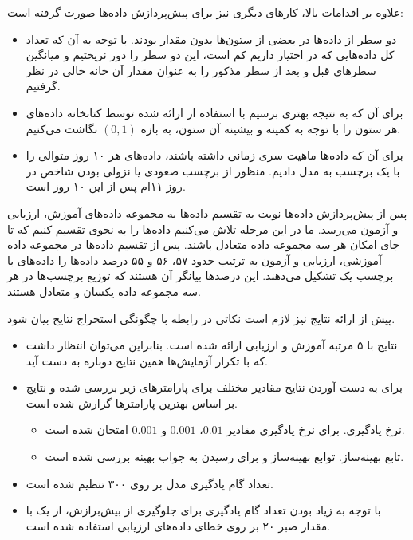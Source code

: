 \documentclass[12pt, a4paper]{book}
\begin{document}
علاوه بر اقدامات بالا، کار‌های دیگری نیز برای پیش‌پردازش داده‌ها صورت گرفته است:

\begin{itemize}
    \item دو سطر از داده‌ها در بعضی از ستون‌ها بدون مقدار بودند. با توجه به آن که تعداد کل داده‌هایی که در اختیار داریم
    کم است، این دو سطر را دور نریختیم و میانگین سطر‌های قبل و بعد از سطر مذکور را به عنوان مقدار آن خانه خالی در
    نظر گرفتیم.
    \item برای آن که به نتیجه بهتری برسیم با استفاده از  ارائه شده توسط کتابخانه 
    داده‌های هر ستون را با توجه به کمینه و بیشینه آن ستون، به بازه $(0,1)$ نگاشت می‌کنیم.
    \item برای آن که داده‌ها ماهیت سری زمانی داشته باشند، داده‌های هر ۱۰ روز متوالی را با یک برچسب به مدل دادیم.
    منظور از برچسب صعودی یا نزولی بودن شاخص در روز ۱۱ام پس از این ۱۰ روز است.
\end{itemize}

پس از پیش‌پردازش داده‌ها نوبت به تقسیم داده‌ها به مجموعه داده‌های آموزش، ارزیابی و آزمون می‌رسد. ما در این مرحله
تلاش می‌کنیم داده‌ها را به نحوی تقسیم کنیم که تا جای امکان هر سه مجموعه داده متعادل باشند. پس از تقسیم داده‌ها
در مجموعه داده آموزشی، ارزیابی و آزمون به ترتیب حدود ۵۷، ۵۶ و ۵۵ درصد داده‌ها را داده‌های با برچسب یک تشکیل می‌دهند.
این درصد‌ها بیانگر آن هستند که توزیع برچسب‌ها در هر سه مجموعه داده یکسان و متعادل هستند.

پیش از ارائه نتایج نیز لازم است نکاتی در رابطه با چگونگی استخراج نتایج بیان شود.

\begin{itemize}
    \item نتایج با ۵ مرتبه آموزش و ارزیابی ارائه شده است. بنابراین می‌توان انتظار داشت که با تکرار آزمایش‌ها
    همین نتایج دوباره به دست آید.
    \item برای به دست آوردن نتایج مقادیر مختلف برای پارامتر‌های زیر بررسی شده و نتایج بر اساس بهترین پارامتر‌ها
    گزارش شده است.
    \begin{itemize}
        \item نرخ یادگیری. برای نرخ یادگیری مقادیر $0.01$، $0.001$ و $0.001$ امتحان شده است.
        \item تابع بهینه‌ساز. توابع بهینه‌ساز  و  برای رسیدن به جواب بهینه بررسی شده است.
    \end{itemize}
    \item تعداد گام یادگیری مدل بر روی ۳۰۰ تنظیم شده است.
    \item با توجه به زیاد بودن تعداد گام یادگیری برای جلوگیری از بیش‌برازش، از یک  با مقدار صبر ۲۰ بر
    روی خطای داده‌های ارزیابی استفاده شده است.
\end{itemize}
\end{document}
